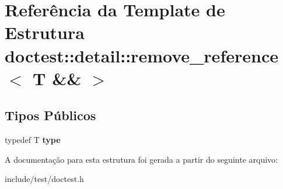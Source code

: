 \hypertarget{structdoctest_1_1detail_1_1remove__reference_3_01T_01_6_6_01_4}{}\section{Referência da Template de Estrutura doctest\+:\+:detail\+:\+:remove\+\_\+reference$<$ T \&\& $>$}
\label{structdoctest_1_1detail_1_1remove__reference_3_01T_01_6_6_01_4}
\subsection*{Tipos Públicos}
\begin{DoxyCompactItemize}
\item 
\mbox{\label{structdoctest_1_1detail_1_1remove__reference_3_01T_01_6_6_01_4_af5f63a14f4e74e0c3c733c00e2f37213}} 
typedef T {\bfseries type}
\end{DoxyCompactItemize}


A documentação para esta estrutura foi gerada a partir do seguinte arquivo\+:\begin{DoxyCompactItemize}
\item 
include/test/doctest.\+h\end{DoxyCompactItemize}
